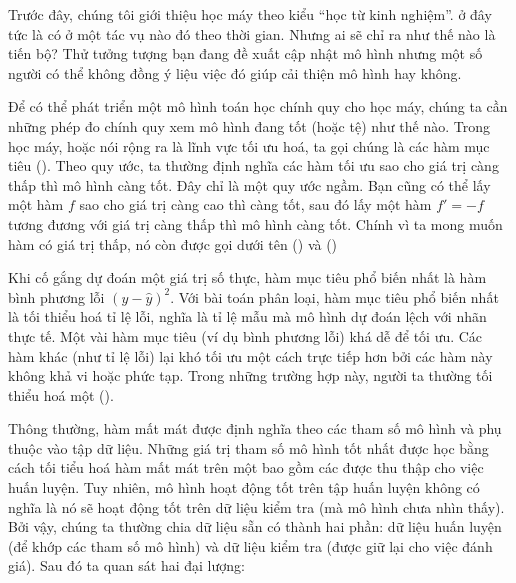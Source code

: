 \documentclass[letterpaper,11pt,english]{sphinxmanual}
\begin{document}
Trước đây, chúng tôi giới thiệu học máy theo kiểu “học từ kinh nghiệm”.
 ở đây tức là có  ở một tác vụ nào đó theo thời gian.
Nhưng ai sẽ chỉ ra như thế nào là tiến bộ? Thử tưởng tượng bạn đang đề
xuất cập nhật mô hình nhưng một số người có thể không đồng ý liệu việc
đó giúp cải thiện mô hình hay không.



Để có thể phát triển một mô hình toán học chính quy cho học máy, chúng
ta cần những phép đo chính quy xem mô hình đang tốt (hoặc tệ) như thế
nào. Trong học máy, hoặc nói rộng ra là lĩnh vực tối ưu hoá, ta gọi
chúng là các hàm mục tiêu (). Theo quy ước, ta
thường định nghĩa các hàm tối ưu sao cho giá trị càng thấp thì mô hình
càng tốt. Đây chỉ là một quy ước ngầm. Bạn cũng có thể lấy một hàm
\(f\) sao cho giá trị càng cao thì càng tốt, sau đó lấy một hàm
\(f' = -f\) tương đương với giá trị càng thấp thì mô hình càng tốt.
Chính vì ta mong muốn hàm có giá trị thấp, nó còn được gọi dưới tên  () và  ()







Khi cố gắng dự đoán một giá trị số thực, hàm mục tiêu phổ biến nhất là
hàm bình phương lỗi \((y-\hat{y})^2\). Với bài toán phân loại, hàm
mục tiêu phổ biến nhất là tối thiểu hoá tỉ lệ lỗi, nghĩa là tỉ lệ mẫu mà
mô hình dự đoán lệch với nhãn thực tế. Một vài hàm mục tiêu (ví dụ bình
phương lỗi) khá dễ để tối ưu. Các hàm khác (như tỉ lệ lỗi) lại khó tối
ưu một cách trực tiếp hơn bởi các hàm này không khả vi hoặc phức tạp.
Trong những trường hợp này, người ta thường tối thiểu hoá một  ().



Thông thường, hàm mất mát được định nghĩa theo các tham số mô hình và
phụ thuộc vào tập dữ liệu. Những giá trị tham số mô hình tốt nhất được
học bằng cách tối tiểu hoá hàm mất mát trên một  bao gồm
các  được thu thập cho việc huấn luyện. Tuy nhiên, mô hình hoạt
động tốt trên tập huấn luyện không có nghĩa là nó sẽ hoạt động tốt trên
dữ liệu kiểm tra (mà mô hình chưa nhìn thấy). Bởi vậy, chúng ta thường
chia dữ liệu sẵn có thành hai phần: dữ liệu huấn luyện (để khớp các tham
số mô hình) và dữ liệu kiểm tra (được giữ lại cho việc đánh giá). Sau đó
ta quan sát hai đại lượng:
\end{document}
